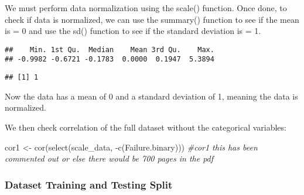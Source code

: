 \documentclass[
]{article}
\newenvironment{Shaded}{\begin{snugshade}}{\end{snugshade}}
\newcommand{\AttributeTok}[1]{\textcolor[rgb]{0.77,0.63,0.00}{#1}}
\newcommand{\CommentTok}[1]{\textcolor[rgb]{0.56,0.35,0.01}{\textit{#1}}}
\newcommand{\ConstantTok}[1]{\textcolor[rgb]{0.00,0.00,0.00}{#1}}
\newcommand{\FunctionTok}[1]{\textcolor[rgb]{0.00,0.00,0.00}{#1}}
\newcommand{\NormalTok}[1]{#1}
\newcommand{\OtherTok}[1]{\textcolor[rgb]{0.56,0.35,0.01}{#1}}
\newcommand{\SpecialCharTok}[1]{\textcolor[rgb]{0.00,0.00,0.00}{#1}}
\begin{document}
We must perform data normalization using the scale() function. Once
done, to check if data is normalized, we can use the summary() function
to see if the mean is = 0 and use the sd() function to see if the
standard deviation is = 1.

\begin{Shaded}
\end{Shaded}

\begin{verbatim}
##    Min. 1st Qu.  Median    Mean 3rd Qu.    Max. 
## -0.9982 -0.6721 -0.1783  0.0000  0.1947  5.3894
\end{verbatim}

\begin{Shaded}
\end{Shaded}

\begin{verbatim}
## [1] 1
\end{verbatim}

Now the data has a mean of 0 and a standard deviation of 1, meaning the
data is normalized.

We then check correlation of the full dataset without the categorical
variables:

\begin{Shaded}
\begin{Highlighting}[]
\NormalTok{cor1 }\OtherTok{\textless{}{-}} \FunctionTok{cor}\NormalTok{(}\FunctionTok{select}\NormalTok{(scale\_data, }\SpecialCharTok{{-}}\FunctionTok{c}\NormalTok{(Failure.binary)))}
\CommentTok{\#cor1 this has been commented out or else there would be 700 pages in the pdf}
\end{Highlighting}
\end{Shaded}

\hypertarget{dataset-training-and-testing-split}{%
\subsubsection{Dataset Training and Testing
Split}\label{dataset-training-and-testing-split}}
\end{document}
